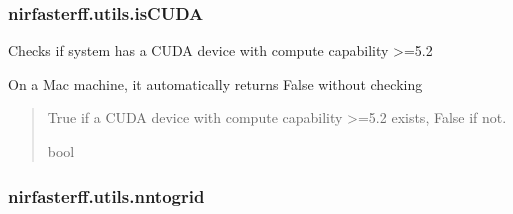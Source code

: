 \documentclass[letterpaper,10pt,english]{sphinxmanual}
\begin{document}
\sphinxstepscope


\subsubsection{nirfasterff.utils.isCUDA}
\label{\detokenize{_autosummary/nirfasterff.utils.isCUDA:nirfasterff-utils-iscuda}}\label{\detokenize{_autosummary/nirfasterff.utils.isCUDA::doc}}

\begin{fulllineitems}
\label{\detokenize{_autosummary/nirfasterff.utils.isCUDA:nirfasterff.utils.isCUDA}}
\pysigstartsignatures
\pysiglinewithargsret
{}
{}
{}
\pysigstopsignatures
\sphinxAtStartPar
Checks if system has a CUDA device with compute capability \textgreater{}=5.2

\sphinxAtStartPar
On a Mac machine, it automatically returns False without checking
\begin{quote}\begin{description}
\sphinxAtStartPar
True if a CUDA device with compute capability \textgreater{}=5.2 exists, False if not.

\sphinxAtStartPar
bool

\end{description}\end{quote}

\end{fulllineitems}


\sphinxstepscope


\subsubsection{nirfasterff.utils.nntogrid}
\label{\detokenize{_autosummary/nirfasterff.utils.nntogrid:nirfasterff-utils-nntogrid}}\label{\detokenize{_autosummary/nirfasterff.utils.nntogrid::doc}}
\end{document}
